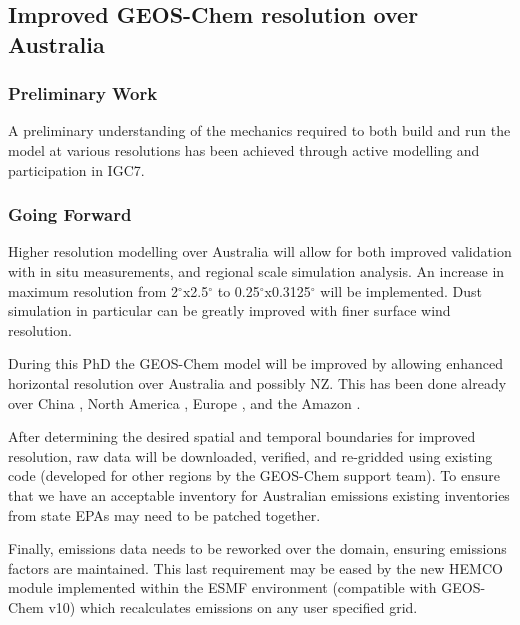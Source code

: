 \subsection{Improved GEOS-Chem resolution over Australia}
\label{resolutionwork}
\subsubsection{Preliminary Work}
A preliminary understanding of the mechanics required to both build and run the model at various resolutions has been achieved through active modelling and participation in IGC7.

\subsubsection{Going Forward}
Higher resolution modelling over Australia will allow for both improved validation with in situ measurements, and regional scale simulation analysis. 
An increase in maximum resolution from 2$^{\circ}$x2.5$^{\circ}$ to 0.25$^{\circ}$x0.3125$^{\circ}$ will be implemented.
Dust simulation in particular can be greatly improved with finer surface wind resolution.

During this PhD the GEOS-Chem model will be improved by allowing enhanced horizontal resolution over Australia and possibly NZ.
This has been done already over China \cite{Chen_2009,Wang_2004}, North America \cite{Zhang_2012}, Europe \cite{Protonotariou_2013}, and the Amazon \cite{Barkley_2013}.

After determining the desired spatial and temporal boundaries for improved resolution, raw data will be downloaded, verified, and re-gridded using existing code (developed for other regions by the GEOS-Chem support team).
To ensure that we have an acceptable inventory for Australian emissions existing inventories from state EPAs may need to be patched together.

Finally, emissions data needs to be reworked over the domain, ensuring emissions factors are maintained.
This last requirement may be eased by the new HEMCO module implemented within the ESMF environment (compatible with GEOS-Chem v10) which recalculates emissions on any user specified grid.
  